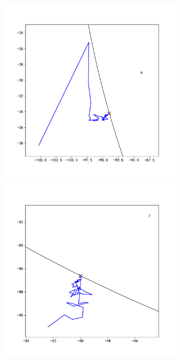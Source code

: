 \documentclass[withoutpreface,bwprint]{cumcmthesis} %
\begin{document}
\begin{figure}[H]
\begin{subfigure}{0.32\linewidth}
    \end{subfigure}
    \begin{subfigure}{0.32\linewidth}
        \includegraphics[width=1.1\linewidth]{figures/c9_6.pdf}
    \end{subfigure}
    \begin{subfigure}{0.32\linewidth}
        \includegraphics[width=1.1\linewidth]{figures/c9_7.pdf}

\end{subfigure}
\end{figure}
\end{document}
